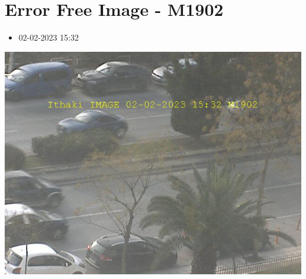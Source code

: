 \documentclass[10pt,a4paper]{article}
\begin{document}
\section*{\textlatin{Error Free Image - M1902}}
\begin{itemize}
  \item 02-02-2023 15:32
\end{itemize}
\begin{center}
  \includegraphics[scale=0.5]{errorFreeImage.png}
  \newline
  \newline
  \newline
  \newline
  \newline
\end{center}
\end{document}
